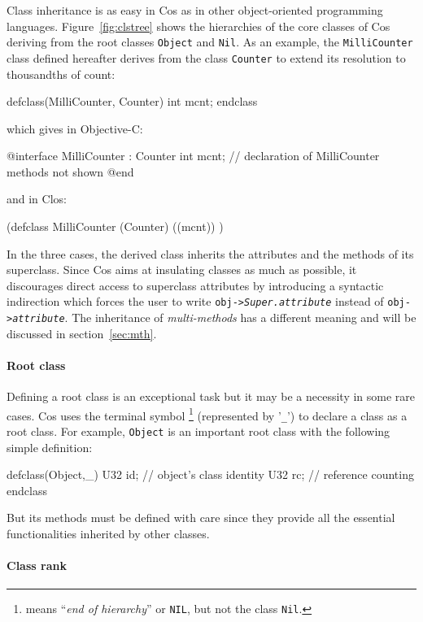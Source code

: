 \documentclass[preprint,10pt]{sigplanconf}
\newcommand{\ProgLang}[1]{{\sc #1}\xspace}
\newcommand{\Clos}      {\ProgLang{Clos}}
\newcommand{\Cos}       {\ProgLang{Cos}}
\newcommand{\Objc}      {\ProgLang{Objective-C}}
\newcommand{\code}[1]{\lstinline[language=COS,style=samplecode]|#1|}
\begin{document}
Class inheritance is as easy in \Cos as in other object-oriented programming languages. Figure~\ref{fig:clstree} shows the hierarchies of the core classes of \Cos deriving from the root classes \code{Object} and \code{Nil}. As an example, the \code{MilliCounter} class defined hereafter derives from the class \code{Counter} to extend its resolution to thousandths of count:
\begin{COS}
defclass(MilliCounter, Counter)
  int mcnt;
endclass
\end{COS}
which gives in \Objc:
\begin{OBJC}
@interface MilliCounter : Counter {
  int mcnt;
}
// declaration of MilliCounter methods not shown
@end
\end{OBJC}
and in \Clos:
\begin{CLOS}
(defclass MilliCounter (Counter) ((mcnt)) )
\end{CLOS}
In the three cases, the derived class inherits the attributes and the methods of its superclass.
Since \Cos aims at insulating classes as much as possible, it discourages direct access to superclass attributes by introducing a syntactic indirection which forces the user to write \code{obj->}{\tt\em Super.attribute} instead of \code{obj->}{\tt\em attribute}. The inheritance of {\em multi-methods} has a different meaning and will be discussed in section~\ref{sec:mth}.

\paragraph{Root class}

Defining a root class is an exceptional task but it may be a necessity in some rare cases. \Cos uses the terminal symbol \footnote{ means ``{\em end of hierarchy}'' or \code{NIL}, but not the class \code{Nil}.} (represented by '\code{_}') to declare a class as a root class. For example, \code{Object} is an important root class with the following simple definition:
\begin{COS}
defclass(Object,_)
  U32 id;		// object's class identity
  U32 rc;		// reference counting
endclass
\end{COS}
But its methods must be defined with care since they provide all the essential functionalities inherited by other classes.

\paragraph{Class rank}
\end{document}
